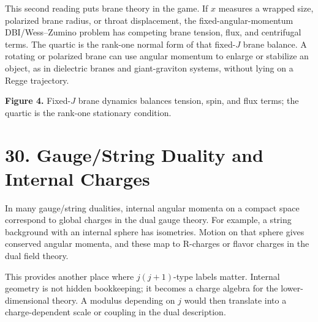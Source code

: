 \documentclass[11pt]{article}
\begin{document}
This second reading puts brane theory in the game. If \(x\) measures a wrapped size, polarized brane radius, or throat displacement, the fixed-angular-momentum DBI/Wess--Zumino problem has competing brane tension, flux, and centrifugal terms. The quartic is the rank-one normal form of that fixed-\(J\) brane balance. A rotating or polarized brane can use angular momentum to enlarge or stabilize an object, as in dielectric branes and giant-graviton systems, without lying on a Regge trajectory.

\begin{center}

\textbf{Figure 4.} Fixed-\(J\) brane dynamics balances tension, spin, and flux terms; the quartic is the rank-one stationary condition.
\end{center}


\section*{30. Gauge/String Duality and Internal Charges}

In many gauge/string dualities, internal angular momenta on a compact space correspond to global charges in the dual gauge theory. For example, a string background with an internal sphere has isometries. Motion on that sphere gives conserved angular momenta, and these map to R-charges or flavor charges in the dual field theory.

This provides another place where \(j(j+1)\)-type labels matter. Internal geometry is not hidden bookkeeping; it becomes a charge algebra for the lower-dimensional theory. A modulus depending on \(j\) would then translate into a charge-dependent scale or coupling in the dual description.
\end{document}
